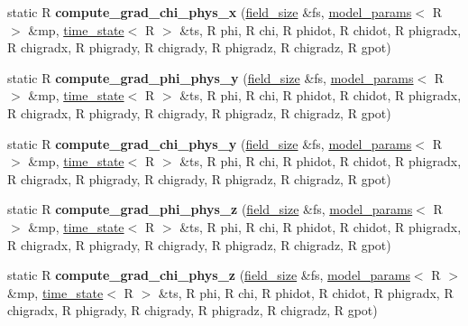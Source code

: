 \begin{DoxyCompactItemize}
\item 
\hypertarget{structgrid__funcs_a0dbe2e8d8e916f1802827f7308e629d6}{
static R {\bfseries compute\_\-grad\_\-chi\_\-phys\_\-x} (\hyperlink{structfield__size}{field\_\-size} \&fs, \hyperlink{structmodel__params}{model\_\-params}$<$ R $>$ \&mp, \hyperlink{structtime__state}{time\_\-state}$<$ R $>$ \&ts, R phi, R chi, R phidot, R chidot, R phigradx, R chigradx, R phigrady, R chigrady, R phigradz, R chigradz, R gpot)}
\label{structgrid__funcs_a0dbe2e8d8e916f1802827f7308e629d6}

\item 
\hypertarget{structgrid__funcs_a3226276af3a50e670a75d4e54c967843}{
static R {\bfseries compute\_\-grad\_\-phi\_\-phys\_\-y} (\hyperlink{structfield__size}{field\_\-size} \&fs, \hyperlink{structmodel__params}{model\_\-params}$<$ R $>$ \&mp, \hyperlink{structtime__state}{time\_\-state}$<$ R $>$ \&ts, R phi, R chi, R phidot, R chidot, R phigradx, R chigradx, R phigrady, R chigrady, R phigradz, R chigradz, R gpot)}
\label{structgrid__funcs_a3226276af3a50e670a75d4e54c967843}

\item 
\hypertarget{structgrid__funcs_aab13e6152b9e142c888fe0685ca613ef}{
static R {\bfseries compute\_\-grad\_\-chi\_\-phys\_\-y} (\hyperlink{structfield__size}{field\_\-size} \&fs, \hyperlink{structmodel__params}{model\_\-params}$<$ R $>$ \&mp, \hyperlink{structtime__state}{time\_\-state}$<$ R $>$ \&ts, R phi, R chi, R phidot, R chidot, R phigradx, R chigradx, R phigrady, R chigrady, R phigradz, R chigradz, R gpot)}
\label{structgrid__funcs_aab13e6152b9e142c888fe0685ca613ef}

\item 
\hypertarget{structgrid__funcs_a66043d65fca8a7f03e7e104a667ba100}{
static R {\bfseries compute\_\-grad\_\-phi\_\-phys\_\-z} (\hyperlink{structfield__size}{field\_\-size} \&fs, \hyperlink{structmodel__params}{model\_\-params}$<$ R $>$ \&mp, \hyperlink{structtime__state}{time\_\-state}$<$ R $>$ \&ts, R phi, R chi, R phidot, R chidot, R phigradx, R chigradx, R phigrady, R chigrady, R phigradz, R chigradz, R gpot)}
\label{structgrid__funcs_a66043d65fca8a7f03e7e104a667ba100}

\item 
\hypertarget{structgrid__funcs_a468a4e9685c549ed471ee099691a230e}{
static R {\bfseries compute\_\-grad\_\-chi\_\-phys\_\-z} (\hyperlink{structfield__size}{field\_\-size} \&fs, \hyperlink{structmodel__params}{model\_\-params}$<$ R $>$ \&mp, \hyperlink{structtime__state}{time\_\-state}$<$ R $>$ \&ts, R phi, R chi, R phidot, R chidot, R phigradx, R chigradx, R phigrady, R chigrady, R phigradz, R chigradz, R gpot)}
\label{structgrid__funcs_a468a4e9685c549ed471ee099691a230e}


\end{DoxyCompactItemize}
